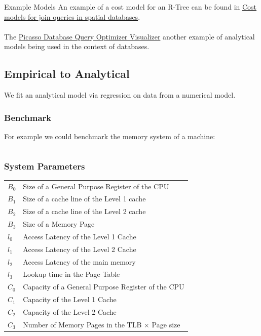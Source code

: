 \begin{sidenotebox}{Example Models}
    An example of a cost model for an R-Tree can be found in
    \href{https://ieeexplore.ieee.org/document/655810}{Cost models for join queries in spatial databases}.
    \\
    \\ The \href{https://dsl.cds.iisc.ac.in/projects/PICASSO/}{Picasso Database Query Optimizer Visualizer} another example of analytical models being used in the context of databases.
\end{sidenotebox}

\subsection{Empirical to Analytical}
We fit an analytical model via regression on data from a numerical model.

\subsubsection{Benchmark}
For example we could benchmark the memory system of a machine:
\inputminted{C}{modelling/code/access.c}

\subsubsection{System Parameters}
\begin{tabular}{l l}
    $B_0$ & Size of a General Purpose Register of the CPU \\
    $B_1$ & Size of a cache line of the Level 1 cache \\
    $B_2$ & Size of a cache line of the Level 2 cache \\
    $B_3$ & Size of a Memory Page \\
    $l_0$ & Access Latency of the Level 1 Cache \\
    $l_1$ & Access Latency of the Level 2 Cache \\
    $l_2$ & Access Latency of the main memory \\
    $l_3$ & Lookup time in the Page Table \\
    $C_0$ & Capacity of a General Purpose Register of the CPU \\
    $C_1$ & Capacity of the Level 1 Cache \\
    $C_2$ & Capacity of the Level 2 Cache \\
    $C_3$ & Number of Memory Pages in the TLB $\times$ Page size \\
\end{tabular}

